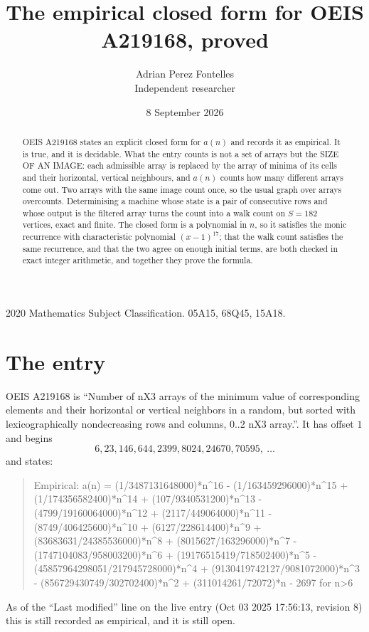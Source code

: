 \documentclass[11pt,a4paper]{article}
\title{The empirical closed form for OEIS A219168, proved}
\author{Adrian Perez Fontelles\\ \small Independent researcher}
\date{8 September 2026}
\theoremstyle{plain}
\theoremstyle{definition}
\begin{document}
\maketitle

\begin{abstract}
OEIS A219168 states an explicit closed form for $a(n)$ and records it as empirical. It is true, and
it is decidable. What the entry counts is not a set of arrays but the SIZE OF AN IMAGE: each
admissible array is replaced by the array of minima of its cells and their horizontal, vertical neighbours,
and $a(n)$ counts how many different arrays come out. Two arrays with the same image count
once, so the usual graph over arrays overcounts. Determinising a machine whose state is a pair
of consecutive rows and whose output is the filtered array turns the count into a walk count on
$S=182$ vertices, exact and finite. The closed form is a polynomial in $n$, so it satisfies the
monic recurrence with characteristic polynomial $(x-1)^{17}$; that the walk count
satisfies the same recurrence, and that the two agree on enough initial terms, are both checked
in exact integer arithmetic, and together they prove the formula.
\end{abstract}

\noindent\small 2020 Mathematics Subject Classification. 05A15, 68Q45, 15A18.\normalsize

\section{The entry}

OEIS A219168 is ``Number of nX3 arrays of the minimum value of corresponding elements and their horizontal or vertical neighbors in a random, but sorted with lexicographically nondecreasing rows and columns, 0..2 nX3 array.''. It has offset $1$ and begins
\[
6, 23, 146, 644, 2399, 8024, 24670, 70595,\ \dots
\]
and states:
\begin{quote}
Empirical: a(n) = (1/3487131648000)*n\^{}16 - (1/163459296000)*n\^{}15 + (1/174356582400)*n\^{}14 + (107/9340531200)*n\^{}13 - (4799/19160064000)*n\^{}12 + (2117/449064000)*n\^{}11 - (8749/406425600)*n\^{}10 + (6127/228614400)*n\^{}9 + (83683631/24385536000)*n\^{}8 + (8015627/163296000)*n\^{}7 - (1747104083/958003200)*n\^{}6 + (19176515419/718502400)*n\^{}5 - (45857964298051/217945728000)*n\^{}4 + (9130419742127/9081072000)*n\^{}3 - (856729430749/302702400)*n\^{}2 + (311014261/72072)*n - 2697 for n>6
\end{quote}
As of the ``Last modified'' line on the live entry (Oct 03 2025 17:56:13, revision 8)
this is still recorded as empirical, and it is still open.
\end{document}
